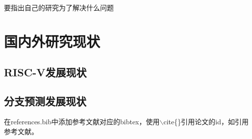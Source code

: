 要指出自己的研究为了解决什么问题

\section{国内外研究现状}

\subsection{RISC-V发展现状}

\subsection{分支预测发展现状}


在references.bib中添加参考文献对应的bibtex，使用$\backslash$cite\{\}引用论文的id，如引用参考文献\cite{barnes2009patchmatch}。




